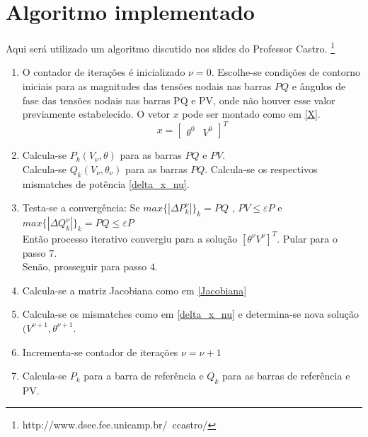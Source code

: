 \section{Algoritmo implementado}

Aqui será utilizado um algoritmo discutido nos slides do Professor Castro. \footnote{http://www.dsee.fee.unicamp.br/~ccastro/}

\begin{enumerate}
    \item   O contador de iterações é inicializado $\nu = 0$.   Escolhe-se condições de contorno iniciais para as magnitudes das tensões nodais nas barras $PQ$ e ângulos de fase das tensões nodais nas barras PQ e PV, onde não houver esse valor previamente estabelecido.
            O vetor $x$ pode ser montado como em \ref{X}.
            \begin{equation}
            x  = \left[ \begin{matrix} \theta^0 & V^0  \end{matrix} \right]^T 
            \label{X}
            \end{equation}
    \item   Calcula-se $P_k(V_\nu, \theta)$ para as barras $PQ$ e $PV$.\\
            Calcula-se $Q_k(V_\nu, \theta_\nu)$ para as barras $PQ$.
            Calcula-se os respectivos mismatches de potência \ref{delta_x_nu}.
    \item   Testa-se a convergência: Se $max \{|\Delta P_k^\nu|\}_k=PQ$ , $PV\leq \varepsilon P$ e $max \{|\Delta Q_k^\nu|\}_k=PQ \leq \varepsilon P$\\
            Então processo iterativo convergiu para a solução $[\theta ^\nu V^\nu]^T$. Pular para o passo $7$.\\
            Senão, prosseguir para passo $4$.
    \item   Calcula-se a matriz Jacobiana como em \ref{Jacobiana}
    \item   Calcula-se os mismatches como em \ref{delta_x_nu} e determina-se nova solução $(V^{\nu + 1},\theta^{\nu + 1}$.
    \item   Incrementa-se contador de iterações $\nu = \nu + 1$
    \item   Calcula-se $P_k$ para a barra de referência e $Q_k$ para as barras de referência e PV.
\end{enumerate}

